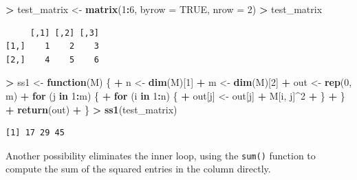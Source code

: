 \documentclass[]{krantz}
\makeatletter
\newenvironment{Shaded}{\begin{snugshade}}{\end{snugshade}}
\newcommand{\ControlFlowTok}[1]{\textcolor[rgb]{0.27,0.27,0.27}{\textbf{#1}}}
\newcommand{\DataTypeTok}[1]{\textcolor[rgb]{0.27,0.27,0.27}{#1}}
\newcommand{\DecValTok}[1]{\textcolor[rgb]{0.06,0.06,0.06}{#1}}
\newcommand{\KeywordTok}[1]{\textcolor[rgb]{0.27,0.27,0.27}{\textbf{#1}}}
\newcommand{\NormalTok}[1]{#1}
\newcommand{\OperatorTok}[1]{\textcolor[rgb]{0.43,0.43,0.43}{\textbf{#1}}}
\newcommand{\OtherTok}[1]{\textcolor[rgb]{0.37,0.37,0.37}{#1}}
\newcommand{\StringTok}[1]{\textcolor[rgb]{0.5,0.5,0.5}{#1}}
\newenvironment{kframe}{%
\medskip{}
\setlength{\fboxsep}{.8em}
 \def\at@end@of@kframe{}%
 \ifinner\ifhmode%
  \def\at@end@of@kframe{\end{minipage}}%
  \begin{minipage}{\columnwidth}%
 \fi\fi%
 \def\FrameCommand##1{\hskip\@totalleftmargin \hskip-\fboxsep
 \colorbox{shadecolor}{##1}\hskip-\fboxsep
     \hskip-\linewidth \hskip-\@totalleftmargin \hskip\columnwidth}%
 \MakeFramed {\advance\hsize-\width
   \@totalleftmargin\z@ \linewidth\hsize
   \@setminipage}}%
 {\par\unskip\endMakeFramed%
 \at@end@of@kframe}
\renewenvironment{Shaded}{\begin{kframe}}{\end{kframe}}
\makeatother
\begin{document}
\begin{Shaded}
\begin{Highlighting}[]
\OperatorTok{>}\StringTok{ }\NormalTok{test_matrix <-}\StringTok{ }\KeywordTok{matrix}\NormalTok{(}\DecValTok{1}\OperatorTok{:}\DecValTok{6}\NormalTok{, }\DataTypeTok{byrow =} \OtherTok{TRUE}\NormalTok{, }\DataTypeTok{nrow =} \DecValTok{2}\NormalTok{)}
\OperatorTok{>}\StringTok{ }\NormalTok{test_matrix}
\end{Highlighting}
\end{Shaded}

\begin{verbatim}
     [,1] [,2] [,3]
[1,]    1    2    3
[2,]    4    5    6
\end{verbatim}

\begin{Shaded}
\begin{Highlighting}[]
\OperatorTok{>}\StringTok{ }\NormalTok{ss1 <-}\StringTok{ }\ControlFlowTok{function}\NormalTok{(M) \{}
\OperatorTok{+}\StringTok{   }\NormalTok{n <-}\StringTok{ }\KeywordTok{dim}\NormalTok{(M)[}\DecValTok{1}\NormalTok{]}
\OperatorTok{+}\StringTok{   }\NormalTok{m <-}\StringTok{ }\KeywordTok{dim}\NormalTok{(M)[}\DecValTok{2}\NormalTok{]}
\OperatorTok{+}\StringTok{   }\NormalTok{out <-}\StringTok{ }\KeywordTok{rep}\NormalTok{(}\DecValTok{0}\NormalTok{, m)}
\OperatorTok{+}\StringTok{   }\ControlFlowTok{for}\NormalTok{ (j }\ControlFlowTok{in} \DecValTok{1}\OperatorTok{:}\NormalTok{m) \{}
\OperatorTok{+}\StringTok{     }\ControlFlowTok{for}\NormalTok{ (i }\ControlFlowTok{in} \DecValTok{1}\OperatorTok{:}\NormalTok{n) \{}
\OperatorTok{+}\StringTok{       }\NormalTok{out[j] <-}\StringTok{ }\NormalTok{out[j] }\OperatorTok{+}\StringTok{ }\NormalTok{M[i, j]}\OperatorTok{^}\DecValTok{2}
\OperatorTok{+}\StringTok{     }\NormalTok{\}}
\OperatorTok{+}\StringTok{   }\NormalTok{\}}
\OperatorTok{+}\StringTok{   }\KeywordTok{return}\NormalTok{(out)}
\OperatorTok{+}\StringTok{ }\NormalTok{\}}
\OperatorTok{>}\StringTok{ }\KeywordTok{ss1}\NormalTok{(test_matrix)}
\end{Highlighting}
\end{Shaded}

\begin{verbatim}
[1] 17 29 45
\end{verbatim}

Another possibility eliminates the inner loop, using the \texttt{sum()} function to compute the sum of the squared entries in the column directly.
\end{document}
